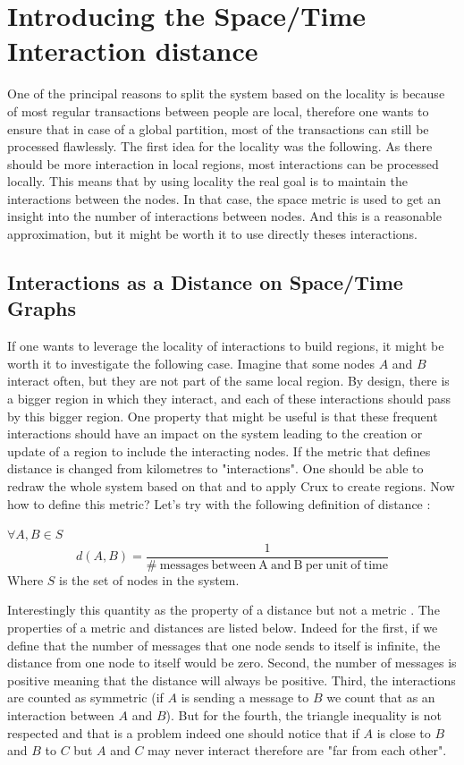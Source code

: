 \documentclass[a4paper,11pt,oneside]{report}
\begin{document}
\section{Introducing the Space/Time Interaction distance}
One of the principal reasons to split the system based on the locality is
because of most regular transactions between people are local, therefore one
wants to ensure that in case of a global partition, most of the transactions
can still be processed flawlessly. The first idea for the locality was the
following. As there should be more interaction in local regions, most
interactions can be processed locally. This means that by using locality the
real goal is to maintain the interactions between the nodes. In that case,
the space metric is used to get an insight into the number of interactions between nodes. And this is a
reasonable approximation, but it might be worth it to use directly theses interactions. 

\subsection{Interactions as a Distance on Space/Time Graphs}

If one wants to leverage the locality of interactions to build regions, it
might be worth it to investigate the following case. Imagine that some nodes
$A$ and $B$ interact often, but they are not part of the same local
region. By design, there is a bigger region in which they interact, and each of
these interactions should pass by this bigger region. One property that might
be useful is that these frequent interactions should have an impact on the
system leading to the creation or update of a region to include the interacting nodes. If the
metric that defines distance is changed from kilometres to "interactions". One
should be able to redraw the whole system based on that and to apply Crux to
create regions. Now how to define this metric? Let's try with the
following definition of distance :


$\forall A, B \in S$
\begin{equation} \label{definition-distance}
  d(A,B) = \frac{1}{ \mathrm{\#\ messages\ between\ A\ and\ B\ per\ unit\ of\ time} } 
\end{equation}
Where $S$ is the set of nodes in the system.

Interestingly this quantity as the property of a distance but not a metric
\cite{Greenhoe2016}. The properties of a metric and distances are listed below. Indeed for the first, if we define that the number of
messages that one node sends to itself is infinite, the distance from one node to itself would be zero. Second, the number of
messages is positive meaning that the distance will always be positive. Third,
the interactions are counted as symmetric (if $A$ is sending a message to $B$
we count that as an interaction between $A$ and $B$). But for the fourth, the triangle
inequality is not respected and that is a problem indeed one should notice that
if $A$ is close to $B$ and $B$ to $C$ but $A$ and $C$ may never interact therefore are "far from each other".  
\end{document}
